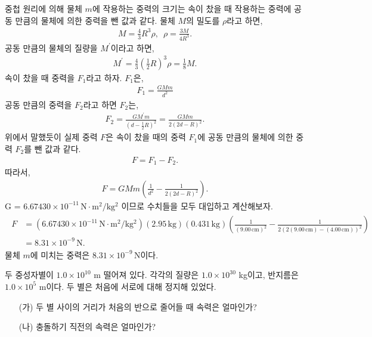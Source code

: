 \documentclass[floatfix,nofootinbib,superscriptaddress,fleqn]{revtex4-2}
\begin{document}
중첩 원리에 의해 물체 $m$에 작용하는 중력의 크기는 속이 찼을 때 
작용하는 중력에 공동 만큼의 물체에 의한 중력을 뺀 값과 같다.
물체 $M$의 밀도를 $\rho$라고 하면,
\begin{align}
    M = \frac{4}{3}R^3\rho ,\,\,\,\rho = \frac{3M}{4R^3}.
\end{align}
공동 만큼의 물체의 질량을 $M^\prime$이라고 하면,
\begin{align}
    M^\prime = \frac{4}{3}{\left(\frac{1}{2}R\right)}^3\rho=\frac{1}{8}M.
\end{align}
속이 찼을 때 중력을 $F_1$라고 하자. $F_1$은,
\begin{align}
    F_1 = \frac{GMm}{d^2}
\end{align}
공동 만큼의 중력을 $F_2$라고 하면 $F_2$는,
\begin{align}
    F_2 = \frac{GM^\prime m}{(d-\frac{1}{2}R)^2}=\frac{GMm}
    {2(2d-R)^2}.
\end{align}
위에서 말했듯이 실제 중력 $F$은 속이 찼을 때의 중력 $F_1$에 공동 만큼의 물체에 의한 중력 $F_2$를
뺀 값과 같다.
\begin{align}
    F= F_1 - F_2.
\end{align}
따라서,
\begin{align}
    F = GMm\left(\frac{1}{d^2}-\frac{1}{2(2d-R)^2}\right).
\end{align}
 G = $6.67430\times 10^{-11}\,\mathrm{N\cdot m^2/kg^2}$ 이므로 수치들을 모두 대입하고 계산해보자.
\begin{align}
    \begin{split}
        F &= \left(6.67430\times 10^{-11}\,\mathrm{N\cdot m^2/kg^2}\right)
        (2.95\,\mathrm{kg})(0.431\,\mathrm{kg})
        \left(\frac{1}{(9.00\,\mathrm{cm})^2}
        -\frac{1}{2(2(9.00\,\mathrm{cm})-(4.00\,\mathrm{cm}))^2}\right) \\
        &=  8.31\times 10^{-9}\,\mathrm{N}.  
    \end{split}
\end{align}
물체 $m$에 미치는 중력은 $8.31\times 10^{-9}\,\mathrm{N}$이다.

\vspace{1.cm}

두 중성자별이 $1.0\times 10^{10}$ m 떨어져 있다. 각각의 질량은
$1.0\times 10^{30} $ kg이고, 반지름은 $1.0\times 10^5$ m이다. 두 별은
처음에 서로에 대해 정지해 있었다.
\begin{itemize}
\item[(가)] 두 별 사이의 거리가 처음의 반으로 줄어들 때 속력은
  얼마인가?
\item[(나)] 충돌하기 직전의 속력은 얼마인가?  
\end{itemize}
\end{document}
